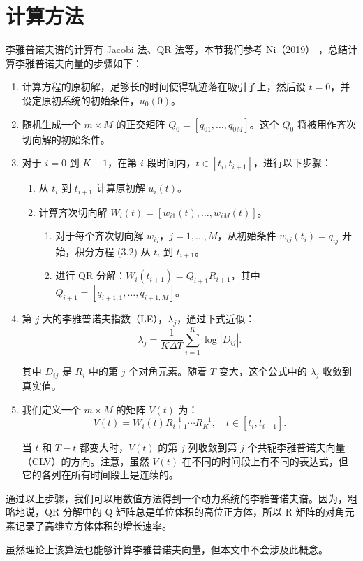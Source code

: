 \section{计算方法}

李雅普诺夫谱的计算有 Jacobi 法、QR 法等，本节我们参考 Ni（2019） \cite{Ni20192}，总结计算李雅普诺夫向量的步骤如下：

\begin{enumerate}\label{alg:lyapunov}

\item 计算方程的原初解，足够长的时间使得轨迹落在吸引子上，然后设 $t = 0$，并设定原初系统的初始条件，$u_0(0)$。

\item 随机生成一个 $m \times M$ 的正交矩阵 $Q_0 = [q_{01}, \ldots, q_{0M}]$。这个 $Q_0$ 将被用作齐次切向解的初始条件。

\item 对于 $i = 0$ 到 $K - 1$，在第 $i$ 段时间内，$t \in [t_i, t_{i+1}]$，进行以下步骤：

\begin{enumerate}

\item 从 $t_i$ 到 $t_{i+1}$ 计算原初解 $u_i(t)$。

\item 计算齐次切向解 $W_i(t) = [w_{i1}(t), \ldots, w_{iM}(t)]$。

\begin{enumerate}

\item 对于每个齐次切向解 $w_{ij}$，$j = 1, \ldots, M$，从初始条件 $w_{ij}(t_i) = q_{ij}$ 开始，积分方程 (3.2) 从 $t_i$ 到 $t_{i+1}$。

\item 进行 QR 分解：$W_i(t_{i+1}) = Q_{i+1} R_{i+1}$，其中 $Q_{i+1} = [q_{i+1,1}, \ldots, q_{i+1,M}]$。

\end{enumerate}

\end{enumerate}

\item 第 $j$ 大的李雅普诺夫指数（LE），$\lambda_j$，通过下式近似：
\begin{equation}
      \lambda_j = \frac{1}{K \Delta T} \sum_{i=1}^K \log |D_{ij}|.
\end{equation}

其中 $D_{ij}$ 是 $R_i$ 中的第 $j$ 个对角元素。随着 $T$ 变大，这个公式中的 $\lambda_j$ 收敛到真实值。

\item 我们定义一个 $m \times M$ 的矩阵 $V(t)$ 为：
\begin{equation}
      V(t) = W_i(t) R^{-1}_{i+1} \cdots R^{-1}_K , \quad t \in [t_i, t_{i+1}].
\end{equation}

当 $t$ 和 $T - t$ 都变大时，$V(t)$ 的第 $j$ 列收敛到第 $j$ 个共轭李雅普诺夫向量（CLV）的方向。注意，虽然 $V(t)$ 在不同的时间段上有不同的表达式，但它的各列在所有时间段上是连续的。

\end{enumerate}

通过以上步骤，我们可以用数值方法得到一个动力系统的李雅普诺夫谱。因为，粗略地说，QR 分解中的 Q 矩阵总是单位体积的高位正方体，所以 R 矩阵的对角元素记录了高维立方体体积的增长速率。

虽然理论上该算法也能够计算李雅普诺夫向量，但本文中不会涉及此概念。
